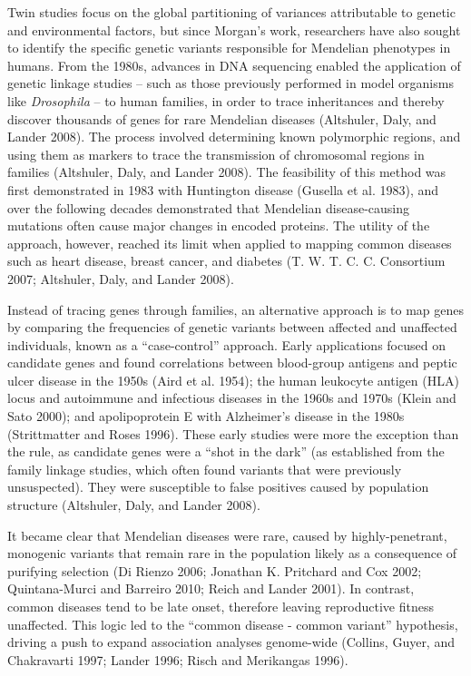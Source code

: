 \documentclass[
]{book}
\begin{document}
Twin studies focus on the global partitioning of variances attributable to genetic and environmental factors, but since Morgan's work, researchers have also sought to identify the specific genetic variants responsible for Mendelian phenotypes in humans. From the 1980s, advances in DNA sequencing enabled the application of genetic linkage studies -- such as those previously performed in model organisms like \emph{Drosophila} -- to human families, in order to trace inheritances and thereby discover thousands of genes for rare Mendelian diseases (Altshuler, Daly, and Lander 2008). The process involved determining known polymorphic regions, and using them as markers to trace the transmission of chromosomal regions in families (Altshuler, Daly, and Lander 2008). The feasibility of this method was first demonstrated in 1983 with Huntington disease (Gusella et al. 1983), and over the following decades demonstrated that Mendelian disease-causing mutations often cause major changes in encoded proteins. The utility of the approach, however, reached its limit when applied to mapping common diseases such as heart disease, breast cancer, and diabetes (T. W. T. C. C. Consortium 2007; Altshuler, Daly, and Lander 2008).

Instead of tracing genes through families, an alternative approach is to map genes by comparing the frequencies of genetic variants between affected and unaffected individuals, known as a ``case-control'' approach. Early applications focused on candidate genes and found correlations between blood-group antigens and peptic ulcer disease in the 1950s (Aird et al. 1954); the human leukocyte antigen (HLA) locus and autoimmune and infectious diseases in the 1960s and 1970s (Klein and Sato 2000); and apolipoprotein E with Alzheimer's disease in the 1980s (Strittmatter and Roses 1996). These early studies were more the exception than the rule, as candidate genes were a ``shot in the dark'' (as established from the family linkage studies, which often found variants that were previously unsuspected). They were susceptible to false positives caused by population structure (Altshuler, Daly, and Lander 2008).

It became clear that Mendelian diseases were rare, caused by highly-penetrant, monogenic variants that remain rare in the population likely as a consequence of purifying selection (Di Rienzo 2006; Jonathan K. Pritchard and Cox 2002; Quintana-Murci and Barreiro 2010; Reich and Lander 2001). In contrast, common diseases tend to be late onset, therefore leaving reproductive fitness unaffected. This logic led to the ``common disease - common variant'' hypothesis, driving a push to expand association analyses genome-wide (Collins, Guyer, and Chakravarti 1997; Lander 1996; Risch and Merikangas 1996).
\end{document}
